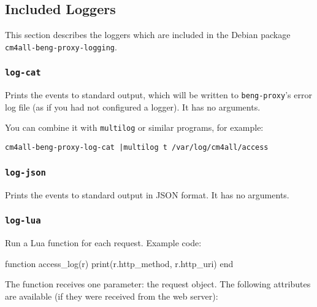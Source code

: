 \documentclass[a4paper,12pt]{article}
\begin{document}
\subsection{Included Loggers}

This section describes the loggers which are included in the Debian
package \texttt{cm4all-beng-proxy-logging}.

\subsubsection{\texttt{log-cat}}

Prints the events to standard output, which will be written to
\texttt{beng-proxy}'s error log file (as if you had not configured a
logger).  It has no arguments.

You can combine it with \texttt{multilog} or similar programs, for
example:

\begin{verbatim}
cm4all-beng-proxy-log-cat |multilog t /var/log/cm4all/access
\end{verbatim}

\subsubsection{\texttt{log-json}}

Prints the events to standard output in JSON format.  It has no
arguments.

\subsubsection{\texttt{log-lua}}

Run a Lua function for each request.  Example code:

\begin{verbatim*}
function access_log(r)
   print(r.http_method, r.http_uri)
end
\end{verbatim*}

The function receives one parameter: the request object.  The
following attributes are available (if they were received from the web
server):
\end{document}
